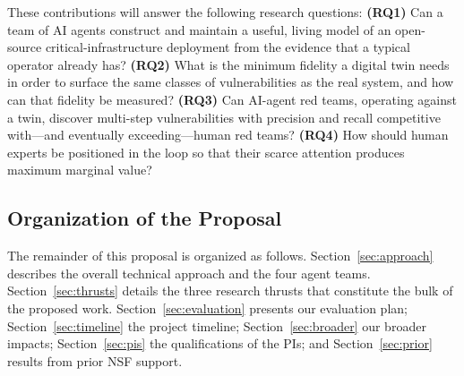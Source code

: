 These contributions will answer the following research questions:
\textbf{(RQ1)} Can a team of AI agents construct and maintain a useful,
living model of an open-source critical-infrastructure deployment from
the evidence that a typical operator already has?
\textbf{(RQ2)} What is the minimum fidelity a digital twin needs in
order to surface the same classes of vulnerabilities as the real
system, and how can that fidelity be measured?
\textbf{(RQ3)} Can AI-agent red teams, operating against a twin,
discover multi-step vulnerabilities with precision and recall
competitive with---and eventually exceeding---human red teams?
\textbf{(RQ4)} How should human experts be positioned in the loop so
that their scarce attention produces maximum marginal value?

\subsection{Organization of the Proposal}
The remainder of this proposal is organized as follows.
Section~\ref{sec:approach} describes the overall technical approach and
the four agent teams.
Section~\ref{sec:thrusts} details the three research thrusts that
constitute the bulk of the proposed work.
Section~\ref{sec:evaluation} presents our evaluation plan;
Section~\ref{sec:timeline} the project timeline;
Section~\ref{sec:broader} our broader impacts;
Section~\ref{sec:pis} the qualifications of the PIs;
and Section~\ref{sec:prior} results from prior NSF support.
